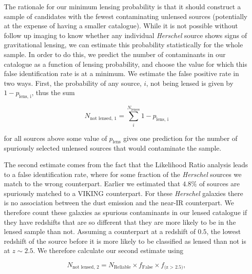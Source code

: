 The rationale for our minimum lensing probability is that it should construct a sample of candidates with the fewest contaminating unlensed sources (potentially at the expense of having a smaller catalogue). While it is not possible without follow up imaging to know whether any individual \textit{Herschel} source shows signs of gravitational lensing, we can estimate this probability statistically for the whole sample. In order to do this, we predict the number of contaminants in our catalogue as a function of lensing probability, and choose the value for which this false identification rate is at a minimum. We estimate the false positive rate in two ways. First, the probability of any source, $i$, not being lensed is given by $1 - p_{\textrm{lens, i}}$, thus the sum 

\begin{equation}
N_{\textrm{not lensed, 1}} = \sum_{i}^{N_{\textrm{lenses}}}{1 - p_{\textrm{lens, i}}}
\label{eq:unlensed_estimate_1}
\end{equation} 

\noindent for all sources above some value of $p_{\textrm{lens}}$ gives one prediction for the number of spuriously selected unlensed sources that would contaminate the sample.

The second estimate comes from the fact that the Likelihood Ratio analysis leads to a false identification rate, where for some fraction of the \textit{Herschel} sources we match to the wrong counterpart. Earlier we estimated that $4.8\%$ of sources are spuriously matched to a VIKING counterpart. For these \textit{Herschel} galaxies there is no association between the dust emission and the near-IR counterpart. We therefore count these galaxies as spurious contaminants in our lensed catalogue if they have redshifts that are so different that they are more likely to be in the lensed sample than not. Assuming a counterpart at a redshift of $0.5$, the lowest redshift of the source before it is more likely to be classified as lensed than not is at $z \sim 2.5$. We therefore calculate our second estimate using

\begin{equation}
N_{\textrm{not lensed, 2}} = N_{\textrm{Reliable}} \times f_{\textrm{False}} \times f_{\textrm{(z > 2.5)}},
\end{equation} 

